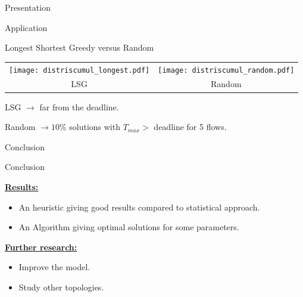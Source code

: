 \documentclass[10 pt]{beamer}
\begin{document}
\begin{section}{Presentation}
\begin{section}{Application}
\end{section}


\begin{frame}{Longest Shortest Greedy versus Random}
   \centering
    \begin{tabular}{c c}
      \texttt{[image: distriscumul\_longest.pdf]} &  \texttt{[image: distriscumul\_random.pdf]}\\
      LSG & Random \\
    \end{tabular}
     LSG $\rightarrow$ far from the deadline.
     
    Random $\rightarrow 10\%$ solutions with $T_{max} >$ deadline for 5 flows.

\end{frame}

\end{section}

\begin{section}{Conclusion}
 

\begin{frame}{Conclusion}

\underline{\bf{\large Results:}}
\begin{itemize}
 \item An heuristic giving good results compared to statistical approach.
 \item An Algorithm giving optimal solutions for some parameters. 
\end{itemize}
\vspace{1cm}
\underline{\bf{\large Further research:}}
\begin{itemize}
 \item Improve the model.
 \item Study other topologies.
\end{itemize}



\end{frame}

\end{section}
\end{document}
